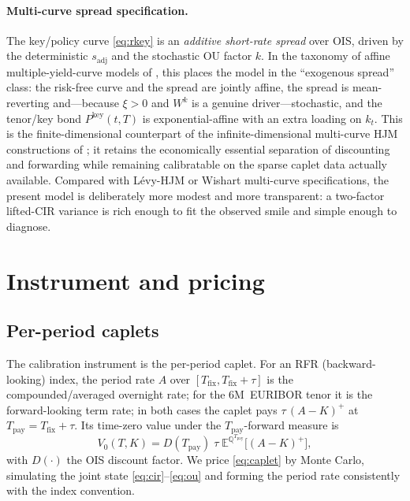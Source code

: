 \documentclass[11pt]{article}
\newcommand{\E}{\mathbb{E}}
\newcommand{\Qmeas}{\mathbb{Q}}
\newcommand{\key}{\mathrm{key}}
\theoremstyle{plain}
\theoremstyle{definition}
\begin{document}
\paragraph{Multi-curve spread specification.}
The key/policy curve \eqref{eq:rkey} is an \emph{additive short-rate spread}
over OIS, driven by the deterministic $s_{\mathrm{adj}}$ and the stochastic OU
factor $k$. In the taxonomy of affine multiple-yield-curve models of
\citet{CFG2019}, this places the model in the ``exogenous spread'' class: the
risk-free curve and the spread are jointly affine, the spread is
mean-reverting and---because $\xi>0$ and $W^k$ is a genuine driver---stochastic,
and the tenor/key bond $P^{\key}(t,T)$ is exponential-affine with an extra
loading on $k_t$. This is the finite-dimensional counterpart of the
infinite-dimensional multi-curve HJM constructions of
\citet{MoreniPallavicini2014, PallaviciniTarenghi2010, SabelliEtal2018,
BienekEtal2023, MantiMolteni2023}; it retains the economically essential
separation of discounting and forwarding while remaining calibratable on the
sparse caplet data actually available. Compared with L\'evy-HJM
\citep{CrepeyEtal2015} or Wishart multi-curve specifications, the present model
is deliberately more modest and more transparent: a two-factor lifted-CIR
variance is rich enough to fit the observed smile and simple enough to diagnose.

\section{Instrument and pricing}

\subsection{Per-period caplets}

The calibration instrument is the per-period caplet. For an RFR (backward-looking)
index, the period rate $A$ over $[T_{\mathrm{fix}}, T_{\mathrm{fix}}+\tau]$ is the
compounded/averaged overnight rate; for the 6M~EURIBOR tenor it is the
forward-looking term rate; in both cases the caplet pays $\tau\,(A-K)^+$ at
$T_{\mathrm{pay}} = T_{\mathrm{fix}}+\tau$. Its time-zero value under the
$T_{\mathrm{pay}}$-forward measure is
\begin{equation}
V_0(T,K) = D(T_{\mathrm{pay}})\;\tau\;
   \E^{\Qmeas^{T_{\mathrm{pay}}}}\!\bigl[(A-K)^+\bigr],
\label{eq:caplet}
\end{equation}
with $D(\cdot)$ the OIS discount factor. We price \eqref{eq:caplet} by Monte
Carlo, simulating the joint state \eqref{eq:cir}--\eqref{eq:ou} and forming the
period rate consistently with the index convention.
\end{document}

